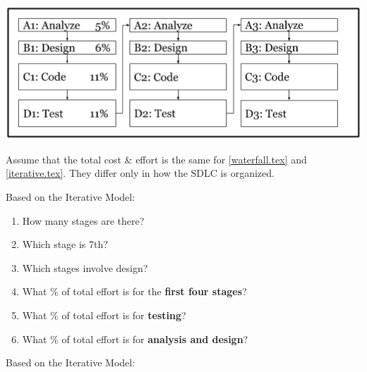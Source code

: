 

\begin{center}
\includegraphics[scale=0.75]{iterative.png}
\end{center}

Assume that the total cost \& effort is the same for \ref{waterfall.tex} and \ref{iterative.tex}.
They differ only in how the SDLC is organized.




\Q Based on the Iterative Model:

\begin{enumerate}%

\setlength{\defaultwidth}{15em}

\item How many stages are there?

\item Which stage is 7th?

\item Which stages involve design?

\item What \% of total effort is for the \textbf{first four stages}?

\item What \% of total effort is for \textbf{testing}?

\item What \% of total effort is for \textbf{analysis and design}?

\end{enumerate}


\Q Based on the Iterative Model:

